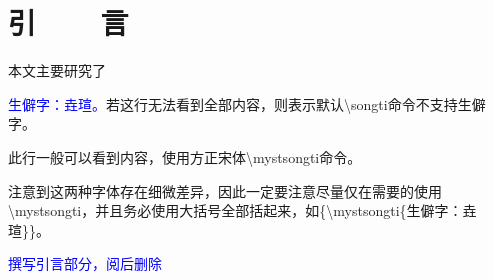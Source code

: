 
\chapter{引~~~~言}
本文主要研究了

\textcolor{blue}{生僻字：垚瑄。}若这行无法看到全部内容，则表示默认\textbackslash{}songti命令不支持生僻字。

\textcolor{blue}{}此行一般可以看到内容，使用方正宋体\textbackslash{}mystsongti命令。

注意到这两种字体存在细微差异，因此一定要注意尽量仅在需要的使用\textbackslash{}mystsongti，并且务必使用大括号全部括起来，如\{\textbackslash{}mystsongti\{生僻字：垚瑄\}\}。

\textcolor{blue}{撰写引言部分，阅后删除}